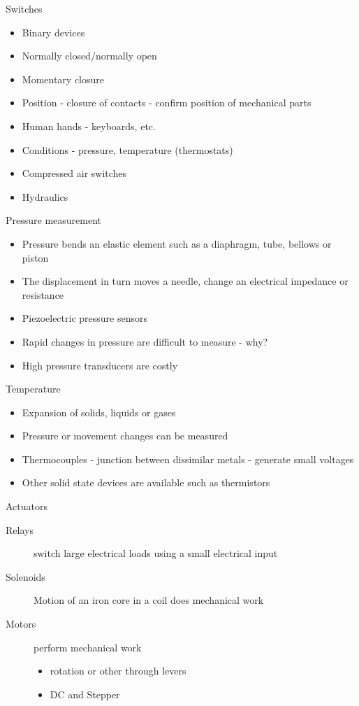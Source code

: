 \documentclass[svgnames,x11names]{beamer}
\begin{document}
\begin{frame}{Switches}
\begin{itemize}
\item Binary devices
\item Normally closed/normally open
\item Momentary closure
\item Position - closure of contacts - confirm position of
mechanical parts
\item Human hands - keyboards, etc.
\item Conditions - pressure, temperature (thermostats)
\item Compressed air switches
\item Hydraulics
\end{itemize}

\end{frame}

\begin{frame}{Pressure measurement}
\begin{itemize}
\item Pressure bends an elastic element such as a
diaphragm, tube, bellows or piston
\item The displacement in turn moves a needle,
change an electrical impedance or
resistance
\item Piezoelectric pressure sensors
\item Rapid changes in pressure are difficult to
measure - why?
\item High pressure transducers are costly
\end{itemize}
\end{frame}

\begin{frame}{Temperature}
\begin{itemize}
\item Expansion of solids, liquids or gases
\item Pressure or movement changes can be
measured
\item Thermocouples - junction between
dissimilar metals - generate small voltages
\item Other solid state devices are available such
as thermistors
\end{itemize}
\end{frame}

\begin{frame}{Actuators}
\begin{description}
\item[Relays] switch large electrical loads using
a small electrical input
\item[Solenoids] Motion of an iron core in a coil
does mechanical work
\item[Motors] perform mechanical work
  \begin{itemize}
  \item rotation or other through levers 
  \item DC and Stepper
  \end{itemize}
\end{description}
\end{frame}
\end{document}
